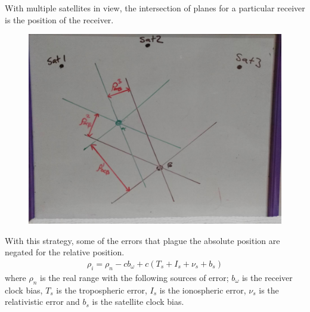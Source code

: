 \documentclass[11pt,a4paper]{article}
\begin{document}
With multiple satellites in view, the intersection of planes for a particular receiver is the position of the receiver.
\begin{figure}[h]
\centering
\caption{}
\label{fig:overall_multiS_duelR}
\includegraphics[width=0.7\linewidth]{overall_multiS_duelR}
\end{figure}

With this strategy, some of the errors that plague the absolute position are negated for the relative position. 
\begin{eqnarray}
\rho_i = \rho_n -cb_\omega + c(T_s + I_s+\nu_s+b_s)
\end{eqnarray}
where $\rho_n$ is the real range with the following sources of error; $b_\omega$ is the receiver clock bias, $T_s$ is the tropospheric error, $I_s$ is the ionospheric error, $\nu_s$ is the relativistic error and $b_s$ is the satellite clock bias.














\end{document}
